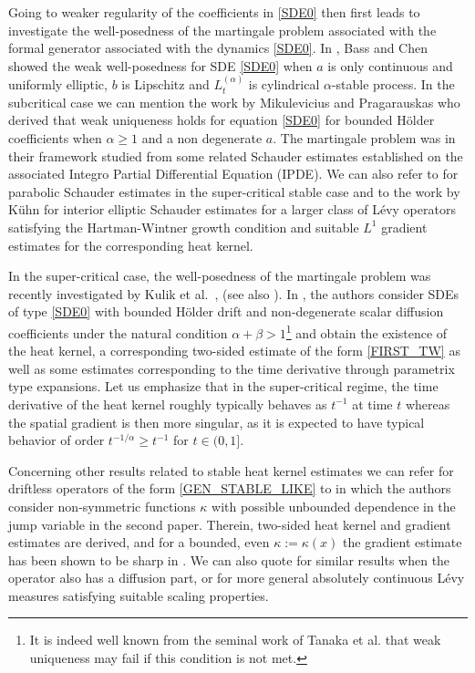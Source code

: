 Going to weaker regularity of the coefficients in \eqref{SDE0} then first leads to investigate the well-posedness of the martingale problem associated with the formal generator associated with the dynamics \eqref{SDE0}. In \cite{Ba-Ch},
Bass and Chen showed the weak well-posedness for SDE \eqref{SDE0} when $a$ is only continuous and uniformly elliptic,
$b$ is Lipschitz and $L^{(\alpha)}_t$ is cylindrical $\alpha$-stable process.
In the subcritical case we can mention the work by Mikulevicius and Pragarauskas \cite{miku:prag:14}
who derived that weak uniqueness holds for equation \eqref{SDE0} for bounded Hölder coefficients when $ \alpha\ge 1$
and a non degenerate $a$. The martingale problem was in their framework studied from some related Schauder estimates established on the associated Integro Partial Differential Equation (IPDE). We can also refer to \cite{chau:meno:prio:20} for {parabolic} Schauder estimates in the super-critical {stable} case and {to the work by Kühn \cite{kuhn:20} for interior elliptic Schauder estimates for a larger class of Lévy operators satisfying the Hartman-Wintner growth condition and suitable $L^1$ gradient estimates for the corresponding heat kernel}.

In the super-critical case, the well-posedness of the martingale problem was recently investigated by
Kulik et al.\ \cite{knop:kuli:18}, \cite{kuli:19} (see also \cite{CZZ}).
In \cite{kuli:19},
the authors consider SDEs of type \eqref{SDE0} with bounded Hölder drift and non-degenerate scalar diffusion coefficients under the natural condition $\alpha+\beta>1 $\footnote{It is indeed well known from the seminal work of Tanaka et al. \cite{tana:tsuc:wata:74} that weak uniqueness may fail if this condition is not met.} and obtain the existence of the heat kernel,
a corresponding two-sided estimate of the form \eqref{FIRST_TW} as well as some estimates corresponding to the time derivative through parametrix type expansions. Let us emphasize that in the super-critical regime, the time derivative of the heat kernel roughly typically behaves as $t^{-1}$ at time $t$ whereas the spatial gradient is then more singular, as it is expected to have typical behavior of order $t^{-1/\alpha}\ge t^{-1} $ for $t\in (0,1] $.

{Concerning other results related to stable heat kernel estimates we can refer \eg for driftless operators
of the form \eqref{GEN_STABLE_LIKE} to \cite{Ch-Zh}
\cite{Ch-Zh1} in which the authors consider non-symmetric functions $\kappa$ with possible unbounded dependence in the jump variable in the second paper. Therein, two-sided heat kernel and gradient estimates are derived, and for a bounded, even $\kappa:=\kappa(x) $ the gradient estimate has been shown to be sharp in \cite{DZ}. We can also quote \cite{CHXZ} for similar results when the operator also has a diffusion part, or \cite{Ch-Zh20} for more general absolutely continuous Lévy measures satisfying suitable scaling properties.
}



